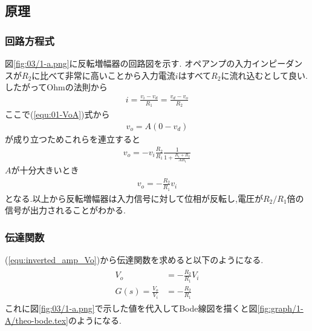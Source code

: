 \subsection{原理}
\subsubsection{回路方程式}
図\ref{fig:03/1-a.png}に反転増幅器の回路図を示す.
オペアンプの入力インピーダンスが$R_2$に比べて非常に高いことから入力電流$i$はすべて$R_2$に流れ込むとして良い.
したがってOhmの法則から
\begin{align}
  \label{equ:inv_amp_circuit_eq}
  i=\frac{v_i-v_d}{R_1}=\frac{v_d-v_o}{R_2}
\end{align}
ここで(\ref{equ:01-VoA})式から
\begin{align}
  v_o=A(0-v_d)
\end{align}
が成り立つためこれらを連立すると
\begin{align}
  v_o=-v_i\frac{R_2}{R_1}\frac{1}{1+\frac{R_1+R_2}{AR_1}}
\end{align}
$A$が十分大きいとき
\begin{align}
  \label{equ:inverted_amp_Vo}
  v_o=-\frac{R_2}{R_1}v_i
\end{align}
となる.以上から反転増幅器は入力信号に対して位相が反転し,電圧が$R_2/R_1$倍の信号が出力されることがわかる.
\subsubsection{伝達関数}
(\ref{equ:inverted_amp_Vo})から伝達関数を求めると以下のようになる.
\begin{align}
  \begin{split}
    \label{equ:inv_amp_transform_eq}
    V_o&=-\frac{R_2}{R_1}V_i\\
    G(s)=\frac{V_o}{V_i}&=-\frac{R_2}{R_1}
  \end{split}
\end{align}
これに図\ref{fig:03/1-a.png}で示した値を代入してBode線図を描くと図\ref{fig:graph/1-A/theo-bode.tex}のようになる.
